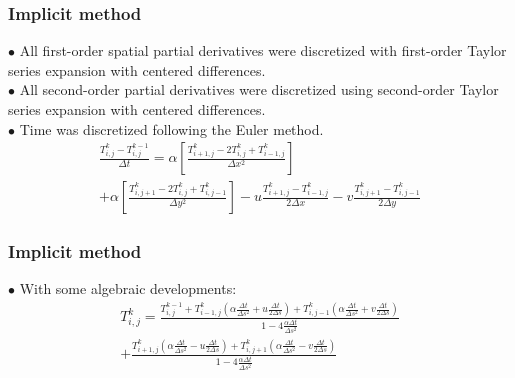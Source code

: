 \documentclass[xcolor=dvipsnames,10pt,aspectratio=169]{beamer}
\begin{document}
\begin{frame}
	\frametitle{Implicit method}
	$\bullet$ All first-order spatial partial derivatives were discretized with first-order Taylor series expansion with centered differences.\\
	$\bullet$ All second-order partial derivatives were discretized using second-order Taylor series expansion with centered differences.\\
	$\bullet$ Time was discretized following the Euler method.\\
	\begin{equation}
		\begin{split}
		\frac{T_{i,j}^{k} - T_{i , j}^{k-1} }{\Delta t}
		= \alpha \left[  \frac{T_{i+1,j}^{k} - 2 T_{i,j}^{k} + T_{i-1,j}^{k} }{\Delta x^2} \right]\\
		+\alpha \left[\frac{T_{i,j+1}^{k} - 2 T_{i,j}^{k} + T_{i,j-1}^{k}}{\Delta y^2}\right] - u \frac{T_{i+1,j}^{k} - T_{i-1,j}^{k}}{2 \Delta x} - v \frac{T_{i,j+1}^{k} - T_{i , j-1}^{k}}{2 \Delta y}
		\end{split}
	\end{equation}
\end{frame}





\begin{frame}
	\frametitle{Implicit method}
	$\bullet$ With some algebraic developments:
	\begin{equation}
		\begin{split}
		T_{i,j}^{k} = \frac{T_{i,j}^{k-1} + T_{i -1, j}^{k} \left( \alpha \frac{\Delta t}{\Delta s^2} + u \frac{\Delta t}{2 \Delta s} \right) 	+ T_{i,j-1}^{k} \left( \alpha \frac{\Delta t}{\Delta s^2} + v \frac{\Delta t}{2 \Delta s} \right)}{ 1 - 4 \frac{\alpha \Delta t}{\Delta s ^2}} \\
		+ \frac{  T_{i+1,j}^{k} \left( \alpha \frac{\Delta t}{ \Delta s^2} - u \frac{\Delta t}{2 \Delta s}\right)
		+  T_{i,j+1}^{k} \left( \alpha \frac{\Delta t}{\Delta s^2} - v \frac{\Delta t}{2 \Delta s}\right)}{ 1 - 4 \frac{\alpha \Delta t}{\Delta s ^2}}
		\end{split}
	\end{equation}
\end{frame}
\end{document}
